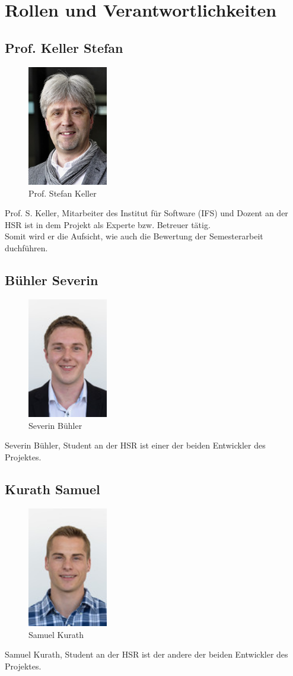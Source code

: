\section{Rollen und Verantwortlichkeiten}
\subsection{Prof. Keller Stefan}
\begin{figure}[H]
	\centering
	\includegraphics[width=35mm]{images/Skeller.jpg}
	\caption{Prof. Stefan Keller}
\end{figure}

Prof. S. Keller, Mitarbeiter des Institut für Software (IFS) und Dozent an
der HSR ist in dem Projekt als Experte bzw. Betreuer tätig. \\
Somit wird er die Aufsicht, wie auch die Bewertung der Semesterarbeit duchführen.

\subsection{Bühler Severin}
\begin{figure}[H]
	\centering
	\includegraphics[width=35mm]{images/sbuehler.jpg}
	\caption{Severin Bühler}
\end{figure}
Severin Bühler, Student an der HSR ist einer der beiden Entwickler des Projektes.

\subsection{Kurath Samuel}
\begin{figure}[H]
	\centering
	\includegraphics[width=35mm]{images/skurath.jpg}
	\caption{Samuel Kurath}
\end{figure}
Samuel Kurath, Student an der HSR ist der andere der beiden Entwickler des Projektes.